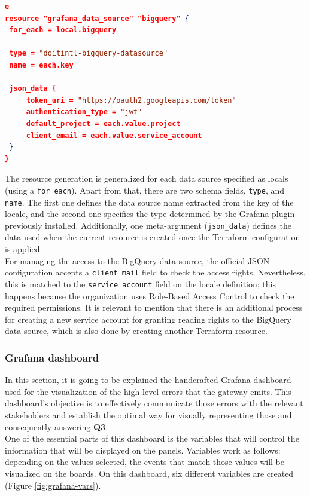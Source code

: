 \documentclass[english, 12pt, a4paper, sci, utf8, a-1b, online]{aaltothesis}
\begin{document}
\begin{lstlisting}[language=json,firstnumber=1]e
resource "grafana_data_source" "bigquery" {
 for_each = local.bigquery
 
 type = "doitintl-bigquery-datasource"
 name = each.key
 
 json_data {
     token_uri = "https://oauth2.googleapis.com/token"
     authentication_type = "jwt"
     default_project = each.value.project
     client_email = each.value.service_account
 }
}
\end{lstlisting}

The resource generation is generalized for each data source specified as locals (using a \texttt{for\_each}). Apart from that, there are two schema fields, \texttt{type}, and \texttt{name}. The first one defines the data source name extracted from the key of the locale, and the second one specifies the type determined by the Grafana plugin previously installed. Additionally, one meta-argument \cite{TerraformMeta} (\texttt{json\_data}) defines the data used when the current resource is created once the Terraform configuration is applied.\\

For managing the access to the BigQuery data source, the official JSON configuration accepts a \texttt{client\_mail} field to check the access rights. Nevertheless, this is matched to the \texttt{service\_account} field on the locale definition; this happens because the organization uses Role-Based Access Control to check the required permissions. It is relevant to mention that there is an additional process for creating a new service account for granting reading rights to the BigQuery data source, which is also done by creating another Terraform resource.

\subsubsection{Grafana dashboard}

In this section, it is going to be explained the handcrafted Grafana dashboard used for the visualization of the high-level errors that the gateway emits. This dashboard's objective is to effectively communicate those errors with the relevant stakeholders and establish the optimal way for visually representing those and consequently answering \textbf{Q3}.\\

One of the essential parts of this dashboard is the variables that will control the information that will be displayed on the panels. Variables work as follows: depending on the values selected, the events that match those values will be visualized on the boards. On this dashboard, six different variables are created (Figure \ref{fig:grafana-vars}).
\end{document}
